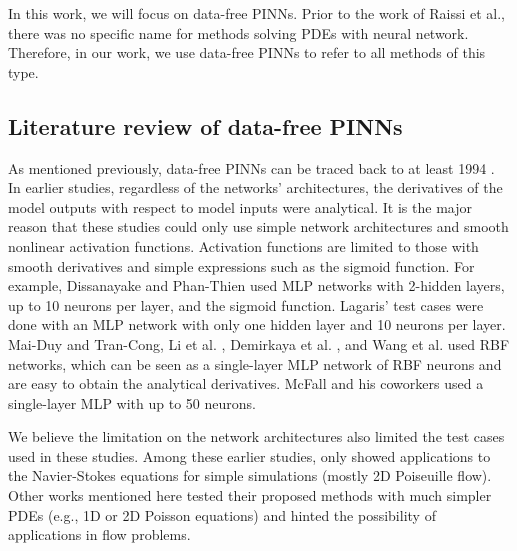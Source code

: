In this work, we will focus on data-free PINNs.
Prior to the work of Raissi et al., there was no specific name for methods solving PDEs with neural network.
Therefore, in our work, we use data-free PINNs to refer to all methods of this type.

\subsection*{Literature review of data-free PINNs}

As mentioned previously, data-free PINNs can be traced back to at least 1994 \cite{dissanayake_neural-network-based_1994}.
In earlier studies, regardless of the networks' architectures, the derivatives of the model outputs with respect to model inputs were analytical.
It is the major reason that these studies could only use simple network architectures and smooth nonlinear activation functions. 
Activation functions are limited to those with smooth derivatives and simple expressions such as the sigmoid function.
For example, Dissanayake and Phan-Thien \cite{dissanayake_neural-network-based_1994} used MLP networks with 2-hidden layers, up to 10 neurons per layer, and the sigmoid function.
Lagaris' test cases \cite{lagaris_artificial_1998} were done with an MLP network with only one hidden layer and 10 neurons per layer.
Mai-Duy and Tran-Cong\cite{mai-duy_numerical_2001}, Li et al. \cite{li_numerical_2003}, Demirkaya et al. \cite{demirkaya_direct_2008}, and Wang et al. \cite{wang_meshless_2015} used RBF networks, which can be seen as a single-layer MLP network of RBF neurons and are easy to obtain the analytical derivatives.
McFall and his coworkers \cite{McFall2009,mcfall_solving_2010} used a single-layer MLP with up to 50 neurons.

We believe the limitation on the network architectures also limited the test cases used in these studies.
Among these earlier studies, only \cite{demirkaya_direct_2008,mcfall_solving_2010,wang_meshless_2015} showed applications to the Navier-Stokes equations for simple simulations (mostly 2D Poiseuille flow). 
Other works mentioned here tested their proposed methods with much simpler PDEs (e.g., 1D or 2D Poisson equations) and hinted the possibility of applications in flow problems.

